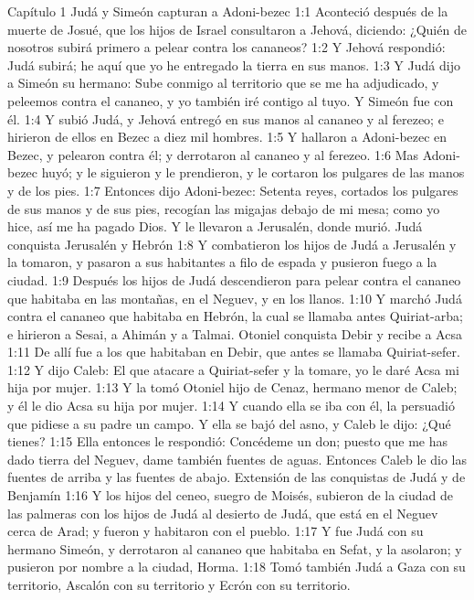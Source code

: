 Capítulo 1
Judá y Simeón capturan a Adoni-bezec  
1:1 Aconteció después de la muerte de Josué, que los hijos de Israel consultaron a Jehová, diciendo: ¿Quién de nosotros subirá primero a pelear contra los cananeos?  
1:2 Y Jehová respondió: Judá subirá; he aquí que yo he entregado la tierra en sus manos.  
1:3 Y Judá dijo a Simeón su hermano: Sube conmigo al territorio que se me ha adjudicado, y peleemos contra el cananeo, y yo también iré contigo al tuyo. Y Simeón fue con él.  
1:4 Y subió Judá, y Jehová entregó en sus manos al cananeo y al ferezeo; e hirieron de ellos en Bezec a diez mil hombres.  
1:5 Y hallaron a Adoni-bezec en Bezec, y pelearon contra él; y derrotaron al cananeo y al ferezeo.  
1:6 Mas Adoni-bezec huyó; y le siguieron y le prendieron, y le cortaron los pulgares de las manos y de los pies.  
1:7 Entonces dijo Adoni-bezec: Setenta reyes, cortados los pulgares de sus manos y de sus pies, recogían las migajas debajo de mi mesa; como yo hice, así me ha pagado Dios. Y le llevaron a Jerusalén, donde murió.  
Judá conquista Jerusalén y Hebrón  
1:8 Y combatieron los hijos de Judá a Jerusalén y la tomaron, y pasaron a sus habitantes a filo de espada y pusieron fuego a la ciudad.  
1:9 Después los hijos de Judá descendieron para pelear contra el cananeo que habitaba en las montañas, en el Neguev, y en los llanos.  
1:10 Y marchó Judá contra el cananeo que habitaba en Hebrón, la cual se llamaba antes Quiriat-arba; e hirieron a Sesai, a Ahimán y a Talmai.  
Otoniel conquista Debir y recibe a Acsa   
1:11 De allí fue a los que habitaban en Debir, que antes se llamaba Quiriat-sefer. 
1:12 Y dijo Caleb: El que atacare a Quiriat-sefer y la tomare, yo le daré Acsa mi hija por mujer.  
1:13 Y la tomó Otoniel hijo de Cenaz, hermano menor de Caleb; y él le dio Acsa su hija por mujer.  
1:14 Y cuando ella se iba con él, la persuadió que pidiese a su padre un campo. Y ella se bajó del asno, y Caleb le dijo: ¿Qué tienes?  
1:15 Ella entonces le respondió: Concédeme un don; puesto que me has dado tierra del Neguev, dame también fuentes de aguas. Entonces Caleb le dio las fuentes de arriba y las fuentes de abajo.  
Extensión de las conquistas de Judá y de Benjamín  
1:16 Y los hijos del ceneo, suegro de Moisés, subieron de la ciudad de las palmeras con los hijos de Judá al desierto de Judá, que está en el Neguev cerca de Arad; y fueron y habitaron con el pueblo.  
1:17 Y fue Judá con su hermano Simeón, y derrotaron al cananeo que habitaba en Sefat, y la asolaron; y pusieron por nombre a la ciudad, Horma.  
1:18 Tomó también Judá a Gaza con su territorio, Ascalón con su territorio y Ecrón con su territorio.  
